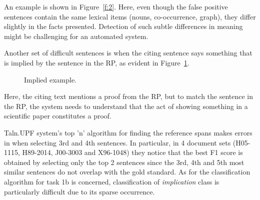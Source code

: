 \documentclass[11pt]{article}
\begin{document}
An example is shown in Figure~\ref{f:2}.  Here, even though the false positive sentences contain the same lexical items (nouns, co-occurrence, graph), they differ slightly in the facts presented. Detection of such subtle differences in meaning might be challenging for an automated system.

Another set of difficult sentences is when the citing sentence says something that is implied by the sentence in the RP, as evident in Figure~\ref{f:3}.

\begin{figure}
\noindent{}
\caption{Implied example.}
\label{f:3}
\end{figure}
Here, the citing text mentions a proof from the RP, but to match the sentence in the RP, the system needs to understand that the act of showing something in a scientific paper constitutes a proof.

Taln.UPF system's top 'n' algorithm for finding the reference spans makes
errors in when selecting 3rd and 4th sentences. In particular,  
in 4 document sets (H05-1115, H89-2014, J00-3003 and X96-1048) they notice 
that the best F1 score is obtained by selecting only the top 2 sentences 
since the 3rd, 4th and 5th most similar sentences do not overlap with 
the gold standard. As for the classification algorithm for task 1b is 
concerned, classification of \textit{implication} class is particularly 
difficult due to its sparse occurrence.
\end{document}

